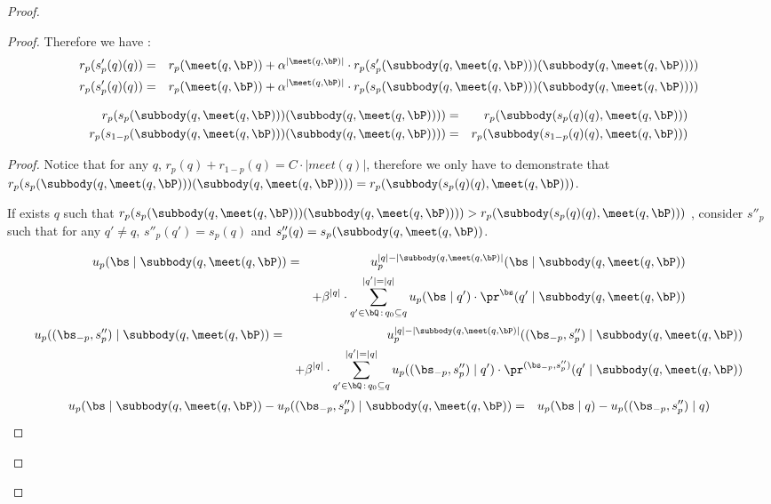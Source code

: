 \begin{proof}
\begin{proof}
Therefore we have :
\begin{eqnarray*}
	r_p(s'_p(q)(q)) &= & r_p(\meet(q,\bP)) + \alpha^{|\meet(q,\bP)|} \cdot r_p(s'_p(\subbody(q,\meet(q,\bP)))(\subbody(q,\meet(q,\bP)))) \\
	r_p(s'_p(q)(q)) &= & r_p(\meet(q,\bP)) + \alpha^{|\meet(q,\bP)|} \cdot r_p(s_p(\subbody(q,\meet(q,\bP)))(\subbody(q,\meet(q,\bP)))) \\
\end{eqnarray*}

\begin{mylem}
	\begin{eqnarray*}
	r_p(s_p(\subbody(q,\meet(q,\bP)))(\subbody(q,\meet(q,\bP)))) &=& r_p(\subbody(s_p(q)(q),\meet(q,\bP)))\\
	r_p(s_{1-p}(\subbody(q,\meet(q,\bP)))(\subbody(q,\meet(q,\bP)))) &=& r_p(\subbody(s_{1-p}(q)(q),\meet(q,\bP)))\\
\end{eqnarray*}
\end{mylem}
\begin{proof}
	Notice that for any $q$, $r_p(q) + r_{1-p}(q) = C \cdot |meet(q)|$, therefore we only have to demonstrate that $r_p(s_p(\subbody(q,\meet(q,\bP)))(\subbody(q,\meet(q,\bP)))) = r_p(\subbody(s_p(q)(q),\meet(q,\bP)))$.
	
	If exists $q$ such that $r_p(s_p(\subbody(q,\meet(q,\bP)))(\subbody(q,\meet(q,\bP)))) > r_p(\subbody(s_p(q)(q),\meet(q,\bP)))$ ,
	consider $s''_p$ such that for any $q' \neq q$, $s''_p(q') = s_p(q)$  and $s''_p(q) = s_p(\subbody(q,\meet(q,\bP))$.
	

	\begin{eqnarray*}
		u_p(\bs \mid \subbody(q,\meet(q,\bP)) & = & u_p^{|q|-|\subbody(q,\meet(q,\bP)|}(\bs \mid \subbody(q,\meet(q,\bP)) \\
		&& + \beta^{|q|} \cdot \sum_{q' \in \bQ \,:\, q_0 \subseteq q}^{|q'| = |q|} u_p(\bs \mid q') \cdot \pr^{\bs}(q' \mid \subbody(q,\meet(q,\bP)) \\ 
	\end{eqnarray*}
	\begin{eqnarray*}
		u_p((\bs_{-p},s''_p) \mid \subbody(q,\meet(q,\bP)) & = & u_p^{|q|-|\subbody(q,\meet(q,\bP)|}((\bs_{-p},s''_p) \mid \subbody(q,\meet(q,\bP)) \\
		&& + \beta^{|q|} \cdot \sum_{q' \in \bQ \,:\, q_0 \subseteq q}^{|q'| = |q|} u_p((\bs_{-p},s''_p) \mid q') \cdot \pr^{(\bs_{-p},s''_p)}(q' \mid \subbody(q,\meet(q,\bP)) \\ 
	\end{eqnarray*}
\begin{eqnarray*}
	u_p(\bs \mid \subbody(q,\meet(q,\bP)) - u_p((\bs_{-p},s''_p) \mid \subbody(q,\meet(q,\bP)) & = & u_p(\bs \mid q)- u_p((\bs_{-p},s''_p)  \mid q)\\
\end{eqnarray*}
\end{proof}
	

\end{proof}
\end{proof}
